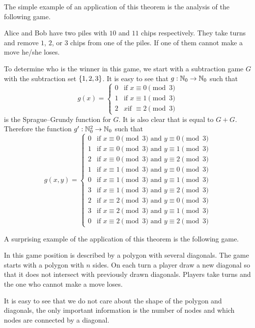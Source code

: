 The simple example of an application of this theorem is the analysis of the
following game.
\begin{game}
\label{game:subtraction-1-2-3-out-of-10-11}
  Alice and Bob have two piles with $10$ and $11$ chips respectively.
  They take turns and remove $1$, $2$, or $3$ chips from one of the piles.
  If one of them cannot make a move he/she loses.
\end{game}

To determine who is the winner in this game, we start with a subtraction game
$G$ with the subtraction set $\set{1, 2, 3}$. It is easy to see that 
$g : {\mathbb{N}}_0 \to {\mathbb{N}}_0$ such that
\[
  g(x) =
  \begin{cases}
    0 & \text{if } x \equiv 0 \pmod{3} \\
    1 & \text{if } x \equiv 1 \pmod{3} \\
    2 & x \text{if } \equiv 2 \pmod{3}
  \end{cases}
\]
is the Sprague--Grundy function for $G$. 
It is also clear that  is equal to 
$G + G$. Therefore the function $g' : {\mathbb{N}}_0^2 \to {\mathbb{N}}_0$ such that 
\[
  g(x, y) =
  \begin{cases}
    0 & \text{if } x \equiv 0 \pmod{3} \text{ and } y \equiv 0 \pmod{3}\\
    1 & \text{if } x \equiv 0 \pmod{3} \text{ and } y \equiv 1 \pmod{3}\\
    2 & \text{if } x \equiv 0 \pmod{3} \text{ and } y \equiv 2 \pmod{3}\\
    1 & \text{if } x \equiv 1 \pmod{3} \text{ and } y \equiv 0 \pmod{3}\\
    0 & \text{if } x \equiv 1 \pmod{3} \text{ and } y \equiv 1 \pmod{3}\\
    3 & \text{if } x \equiv 1 \pmod{3} \text{ and } y \equiv 2 \pmod{3}\\
    2 & \text{if } x \equiv 2 \pmod{3} \text{ and } y \equiv 0 \pmod{3}\\
    3 & \text{if } x \equiv 2 \pmod{3} \text{ and } y \equiv 1 \pmod{3}\\
    0 & \text{if } x \equiv 2 \pmod{3} \text{ and } y \equiv 2 \pmod{3}
  \end{cases}
\]

A surprising example of the application of this theorem is the following game.
\begin{game}
\label{game:polygon}
  In this game position is described by a polygon with several diagonals. 
  The game starts with a polygon with $n$ sides. On each turn a player draw a
  new diagonal so that it does not intersect with previously drawn diagonals.
  Players take turns and the one who cannot make a move loses.
\end{game}
It is easy to see that we do not care about the shape of the polygon and
diagonals, the only important information is the number of nodes and which nodes
are connected by a diagonal. 

